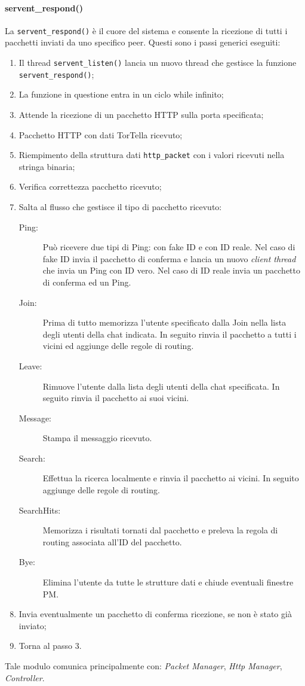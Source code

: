 \paragraph{servent\_respond()}
La \texttt{servent\_respond()} è il cuore del sistema e consente la ricezione di tutti i pacchetti inviati da uno specifico peer. Questi sono i passi generici eseguiti:
\begin{enumerate}
\item Il thread \texttt{servent\_listen()} lancia un nuovo thread che gestisce la funzione \texttt{servent\_respond()};
\item La funzione in questione entra in un ciclo while infinito;
\item Attende la ricezione di un pacchetto HTTP sulla porta specificata;
\item Pacchetto HTTP con dati TorTella ricevuto;
\item Riempimento della struttura dati \texttt{http\_packet} con i valori ricevuti nella stringa binaria;
\item Verifica correttezza pacchetto ricevuto;
\item Salta al flusso che gestisce il tipo di pacchetto ricevuto:
\begin{description}
	\item[Ping:] Può ricevere due tipi di Ping: con fake ID e con ID reale. Nel caso di fake ID invia il pacchetto di conferma e lancia un nuovo \textit{client thread} che invia un Ping con ID vero. Nel caso di ID reale invia un pacchetto di conferma ed un Ping.
	\item[Join:] Prima di tutto memorizza l'utente specificato dalla Join nella lista degli utenti della chat indicata. In seguito rinvia il pacchetto a tutti i vicini ed aggiunge delle regole di routing.
	\item[Leave:] Rimuove l'utente dalla lista degli utenti della chat specificata. In seguito rinvia il pacchetto ai suoi vicini.
	\item[Message:] Stampa il messaggio ricevuto.
	\item[Search:] Effettua la ricerca localmente e rinvia il pacchetto ai vicini. In seguito aggiunge delle regole di routing.
	\item[SearchHits:] Memorizza i risultati tornati dal pacchetto e preleva la regola di routing associata all'ID del pacchetto.
	\item[Bye:] Elimina l'utente da tutte le strutture dati e chiude eventuali finestre PM.
\end{description}
\item Invia eventualmente un pacchetto di conferma ricezione, se non è stato già inviato;
\item Torna al passo 3.
\end{enumerate}
Tale modulo comunica principalmente con: \textit{Packet Manager}, \textit{Http Manager}, \textit{Controller}.
